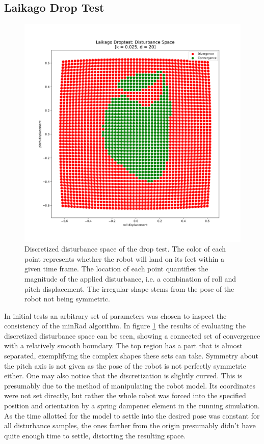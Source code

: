     \subsection{Laikago Drop Test}
    \begin{figure}[b!]
    \centering
    \includegraphics[width=.5\linewidth]{figures/droptest_ds_v2.png}
    \caption[Discretized Disturbande Space, Drop Test]{Discretized disturbance space of the drop test. The color of each point represents whether the robot will land on its feet within a given time frame. The location of each point quantifies the magnitude of the applied disturbance, i.e. a combination of roll and pitch displacement. The irregular shape stems from the pose of the robot not being symmetric.}
    \label{fig:drop}
    \end{figure}    
    In initial tests an arbitrary set of parameters was chosen to inspect the consistency of the minRad algorithm. In figure \ref{fig:drop} the results of evaluating the discretized disturbance space can be seen, showing a connected set of convergence with a relatively smooth boundary. The top region has a part that is almost separated, exemplifying the complex shapes these sets can take. Symmetry about the pitch axis is not given as the pose of the robot is not perfectly symmetric either. One may also notice that the discretization is slightly curved. This is presumably due to the method of manipulating the robot model. Its coordinates were not set directly, but rather the whole robot was forced into the specified position and orientation by a spring dampener element in the running simulation. As the time allotted for the model to settle into the desired pose was constant for all disturbance samples, the ones farther from the origin presumably didn't have quite enough time to settle, distorting the resulting space.
    
